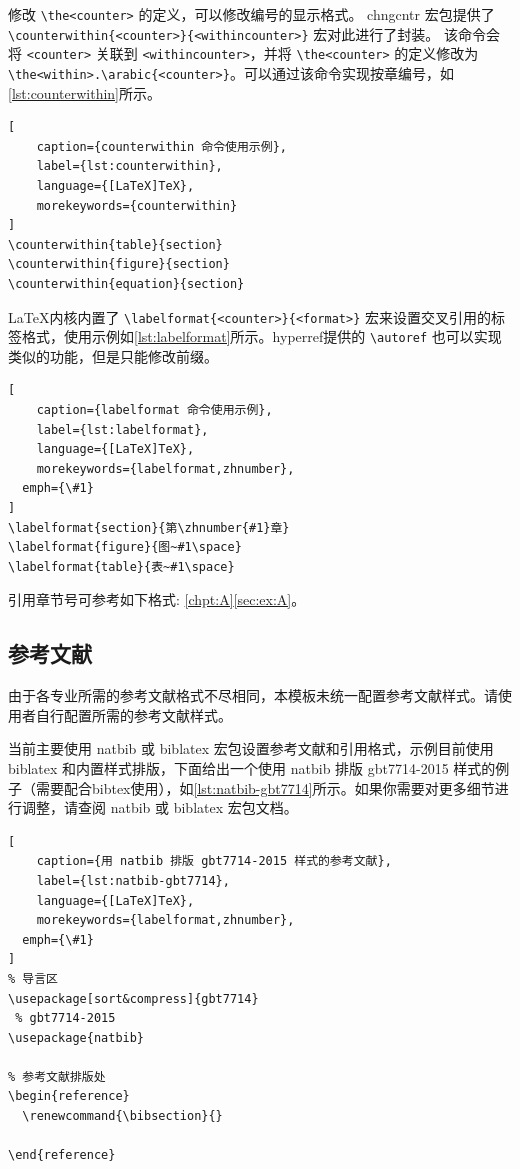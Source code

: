 \documentclass{nktba}
\begin{document}
修改 \verb|\the<counter>| 的定义，可以修改编号的显示格式。 chngcntr 宏包提供了 \verb|\counterwithin{<counter>}{<withincounter>}| 宏对此进行了封装。 该命令会将 \verb|<counter>| 关联到 \verb|<withincounter>|，并将 \verb|\the<counter>| 的定义修改为 \verb|\the<within>.\arabic{<counter>}|。可以通过该命令实现按章编号，如\ref{lst:counterwithin}所示。

\begin{lstlisting}[
	caption={counterwithin 命令使用示例},
	label={lst:counterwithin},
	language={[LaTeX]TeX},
	morekeywords={counterwithin}
]
\counterwithin{table}{section}
\counterwithin{figure}{section}
\counterwithin{equation}{section}
\end{lstlisting}

\LaTeX 内核内置了 \verb|\labelformat{<counter>}{<format>}| 宏来设置交叉引用的标签格式，使用示例如\ref{lst:labelformat}所示。hyperref提供的 \verb|\autoref| 也可以实现类似的功能，但是只能修改前缀。

\begin{lstlisting}[
	caption={labelformat 命令使用示例},
	label={lst:labelformat},
	language={[LaTeX]TeX},
	morekeywords={labelformat,zhnumber},
  emph={\#1}
]
\labelformat{section}{第\zhnumber{#1}章}
\labelformat{figure}{图~#1\space}
\labelformat{table}{表~#1\space}
\end{lstlisting}

引用章节号可参考如下格式: \ref{chpt:A}\ref{sec:ex:A}。

\subsection{参考文献} \label{manual:ref}

由于各专业所需的参考文献格式不尽相同，本模板未统一配置参考文献样式。请使用者自行配置所需的参考文献样式。

当前主要使用 natbib 或 biblatex 宏包设置参考文献和引用格式，示例目前使用 biblatex 和内置样式排版，下面给出一个使用 natbib 排版 gbt7714-2015 样式的例子（需要配合bibtex使用），如\ref{lst:natbib-gbt7714}所示。如果你需要对更多细节进行调整，请查阅 natbib 或 biblatex 宏包文档。

\begin{lstlisting}[
	caption={用 natbib 排版 gbt7714-2015 样式的参考文献},
	label={lst:natbib-gbt7714},
	language={[LaTeX]TeX},
	morekeywords={labelformat,zhnumber},
  emph={\#1}
]
% 导言区
\usepackage[sort&compress]{gbt7714}
 % gbt7714-2015
\usepackage{natbib}

% 参考文献排版处
\begin{reference}
  \renewcommand{\bibsection}{}
  
\end{reference}
\end{lstlisting}
\end{document}
